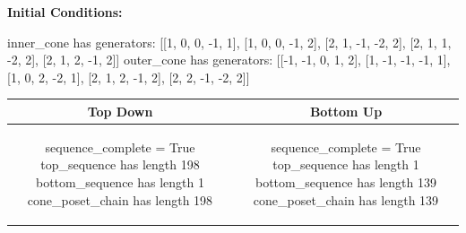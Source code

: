 \documentclass[10pt]{article}
\begin{document}
\textbf{Initial Conditions:}
\begin{SAGE}
inner_cone has generators: 
[[1, 0, 0, -1, 1], [1, 0, 0, -1, 2], [2, 1, -1, -2, 2], [2, 1, 1, -2, 2], [2, 1, 2, -1, 2]]
outer_cone has generators: 
[[-1, -1, 0, 1, 2], [1, -1, -1, -1, 1], [1, 0, 2, -2, 1], [2, 1, 2, -1, 2], [2, 2, -1, -2, 2]]

\end{SAGE}
\begin{tabular}{c|c}
\textbf{Top Down} & \textbf{Bottom Up} \\ \hline  
\begin{SAGE}
sequence_complete = True
top_sequence has length 198
bottom_sequence has length 1
cone_poset_chain has length 198
\end{SAGE} 
&
\begin{SAGE}
sequence_complete = True
top_sequence has length 1
bottom_sequence has length 139
cone_poset_chain has length 139
\end{SAGE} 
\\ \hline


\end{tabular}
\end{document}
